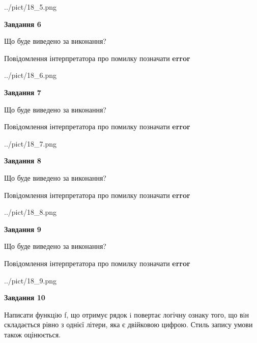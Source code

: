 \documentclass[12pt, ukrainian]{article}
\begin{document}
{\begin {large}
\begin{center}
	{../pict/18_5.png}
\end{center}
\newpage

{\begin {center}\textbf{Завдання 6}\end {center}}\par
Що буде виведено за виконання? \par
Повідомлення інтерпретатора про помилку позначати \textbf{error}

\begin{center}
	{../pict/18_6.png}
\end{center}
\newpage

{\begin {center}\textbf{Завдання 7}\end {center}}\par
Що буде виведено за виконання? \par
Повідомлення інтерпретатора про помилку позначати \textbf{error}

\begin{center}
	{../pict/18_7.png}
\end{center}
\newpage

{\begin {center}\textbf{Завдання 8}\end {center}}\par
Що буде виведено за виконання? \par
Повідомлення інтерпретатора про помилку позначати \textbf{error}

\begin{center}
	{../pict/18_8.png}
\end{center}
\newpage

{\begin {center}\textbf{Завдання 9}\end {center}}\par
Що буде виведено за виконання? \par
Повідомлення інтерпретатора про помилку позначати \textbf{error}

\begin{center}
	{../pict/18_9.png}
\end{center}
\newpage

{\begin {center}\textbf{Завдання 10}\end {center}}\par

Написати функцiю f, що отримує рядок i повертає логічну ознаку того, що вiн складається рівно з однієї літери, яка є двійковою цифрою. Стиль запису умови також оцінюється.\par
\newpage

\end {large}}
\end{document}
